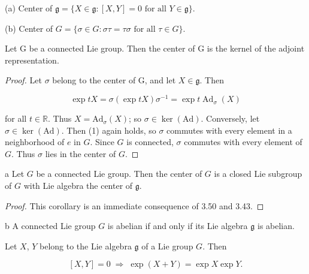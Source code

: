 \begin{definition}\label{thm:3.49}
(a) Center of $\mathfrak{g}=\{X\in\mathfrak{g}:[X,Y]=0 \text{ for all } Y\in\mathfrak{g}\}$.

(b) Center of  $ G = \{\sigma \in G: \sigma \tau = \tau \sigma \text{ for all } \tau \in G\} $.

\end{definition}

\begin{theorem}\label{thm:3.50}
Let G be a connected Lie group. Then the center of G is the kernel of the adjoint representation.

\end{theorem}

\begin{proof}
Let  $ \sigma $ belong to the center of G, and let  $ X \in \mathfrak{g} $. Then

\begin{equation}
\tag{1}\label{eq:3.50:1}
\exp tX=\sigma(\exp tX)\sigma^{-1}=\exp t\operatorname{Ad}_{\sigma}(X)
\end{equation}

for all $t\in\mathbb{R}$. Thus $X=\mathrm{Ad}_{\sigma}(X)$; so $\sigma\in\ker(\mathrm{Ad})$. Conversely, let $\sigma\in\ker(\mathrm{Ad})$. Then (1) again holds, so $\sigma$ commutes with every element in a neighborhood of $e$ in $G$. Since $G$ is connected, $\sigma$ commutes with every element of $G$. Thus $\sigma$ lies in the center of $G$.

\end{proof}

\begin{corollary*}{a}
Let $G$ be a connected Lie group. Then the center of $G$ is a closed Lie subgroup of $G$ with Lie algebra the center of $\mathfrak{g}$.
\end{corollary*}

\begin{proof}
This corollary is an immediate consequence of 3.50 and 3.43.
\end{proof}

\begin{corollary*}{b}
A connected Lie group $G$ is abelian if and only if its Lie algebra $\mathfrak{g}$ is abelian.
\end{corollary*}

\begin{proposition}\label{thm:3.51}
Let $X$, $Y$ belong to the Lie algebra $\mathfrak{g}$ of a Lie group $G$. Then

\[
[X,Y]=0\;\Rightarrow\;\exp(X+Y)=\exp X\exp Y.
\]

\end{proposition}

